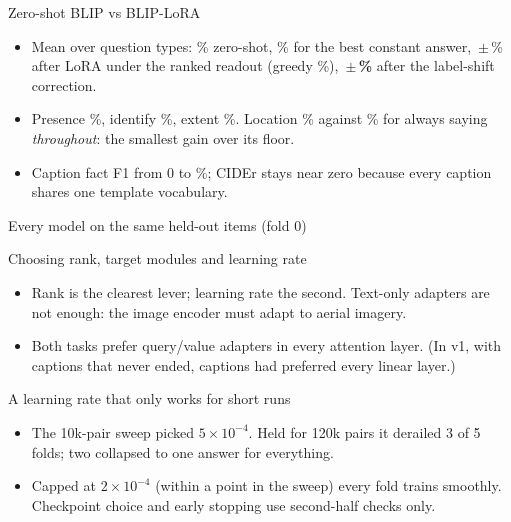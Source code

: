 \documentclass[aspectratio=169,10pt,t]{beamer}
\begin{document}
\begin{frame}{Zero-shot BLIP vs BLIP-LoRA}
\centering
\resizebox{\textwidth}{!}{}
\begin{itemize}
\item Mean over question types: \zeroMean\% zero-shot, \constMean\% for the best constant answer, \blipMean\,$\pm$\,\blipMeanStd\% after LoRA under the ranked readout (greedy \blipGreedy\%), \textbf{\blipCorrMean\,$\pm$\,\blipCorrMeanStd\%} after the label-shift correction.
\item Presence \blipPresence\%, identify \blipIdentify\%, extent \blipExtent\%. Location \blipLocation\% against \constLocation\% for always saying \emph{throughout}: the smallest gain over its floor.
\item Caption fact F1 from 0 to \blipFactF\%; CIDEr stays near zero because every caption shares one template vocabulary.
\end{itemize}
\end{frame}

\begin{frame}{Every model on the same held-out items (fold 0)}
\centering
{}
\end{frame}

\begin{frame}{Choosing rank, target modules and learning rate}
\centering
{}
\begin{itemize}
\item Rank is the clearest lever; learning rate the second. Text-only adapters are not enough: the image encoder must adapt to aerial imagery.
\item Both tasks prefer query/value adapters in every attention layer. (In v1, with captions that never ended, captions had preferred every linear layer.)
\end{itemize}
\end{frame}

\begin{frame}{A learning rate that only works for short runs}
\centering
{}
\begin{itemize}
\item The 10k-pair sweep picked $5\!\times\!10^{-4}$. Held for 120k pairs it derailed 3 of 5 folds; two collapsed to one answer for everything.
\item Capped at $2\!\times\!10^{-4}$ (within a point in the sweep) every fold trains smoothly. Checkpoint choice and early stopping use second-half checks only.
\end{itemize}
\end{frame}
\end{document}
